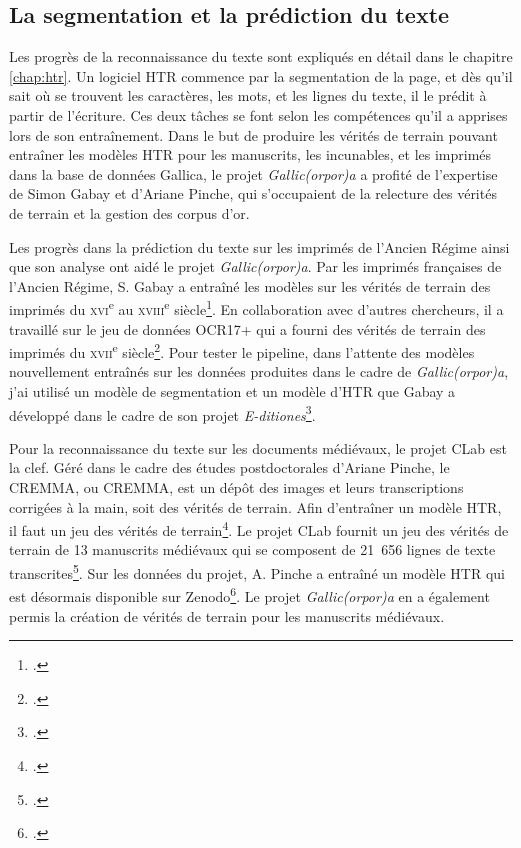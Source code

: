 \documentclass[class=article, crop=false]{standalone}
\begin{document}
\subsection{La segmentation et la prédiction du texte}
Les progrès de la reconnaissance du texte sont expliqués en détail dans le chapitre \ref{chap:htr}. Un logiciel \acrshort{HTR} commence par la segmentation de la page, et dès qu'il sait où se trouvent les caractères, les mots, et les lignes du texte, il le prédit à partir de l'écriture. Ces deux tâches se font selon les compétences qu'il a apprises lors de son entraînement. Dans le but de produire les vérités de terrain pouvant entraîner les modèles \acrshort{HTR} pour les manuscrits, les incunables, et les imprimés dans la base de données Gallica, le projet \textit{Gallic(orpor)a} a profité de l'expertise de Simon Gabay et d'Ariane Pinche, qui s'occupaient de la relecture des vérités de terrain et la gestion des corpus d'or.

Les progrès dans la prédiction du texte sur les imprimés de l'Ancien Régime ainsi que son analyse ont aidé le projet \textit{Gallic(orpor)a}. Par les imprimés françaises de l'Ancien Régime, S. Gabay a entraîné les modèles sur les vérités de terrain des imprimés du \textsc{xvi}\textsuperscript{e} au \textsc{xviii}\textsuperscript{e} siècle\footcite{gabayStandardizingLinguisticData2020}. En collaboration avec d'autres chercheurs, il a travaillé sur le jeu de données OCR17+ qui a fourni des vérités de terrain des imprimés du \textsc{xvii}\textsuperscript{e} siècle\footcite{gabayOCR17GroundTruth2020}. Pour tester le pipeline, dans l'attente des modèles nouvellement entraînés sur les données produites dans le cadre de \textit{Gallic(orpor)a}, j'ai utilisé un modèle de segmentation et un modèle d'\acrshort{HTR} que Gabay a développé dans le cadre de son projet \textit{E-ditiones}\footcite{gabayEditiones17thFrench2018}.

Pour la reconnaissance du texte sur les documents médiévaux, le projet \Gls{CLab} est la clef. Géré dans le cadre des études postdoctorales d'Ariane Pinche, le \acrlong{CREMMA}, ou \acrshort{CREMMA}, est un dépôt des images et leurs transcriptions corrigées à la main, soit des vérités de terrain. Afin d'entraîner un modèle \acrshort{HTR}, il faut un jeu des vérités de terrain\footcite{chagueHTRUnitedMutualisonsVerite2021}. Le projet \Gls{CLab} fournit un jeu des vérités de terrain de 13 manuscrits médiévaux qui se composent de 21~656 lignes de texte transcrites\footcite{pincheCremmaLabProjectTranscription2022}. Sur les données du projet, A. Pinche a entraîné un modèle \acrshort{HTR} qui est désormais disponible sur Zenodo\footcite{pincheHTRModelCremma2022}. Le projet \textit{Gallic(orpor)a} en a également permis la création de vérités de terrain pour les manuscrits médiévaux.
\end{document}
